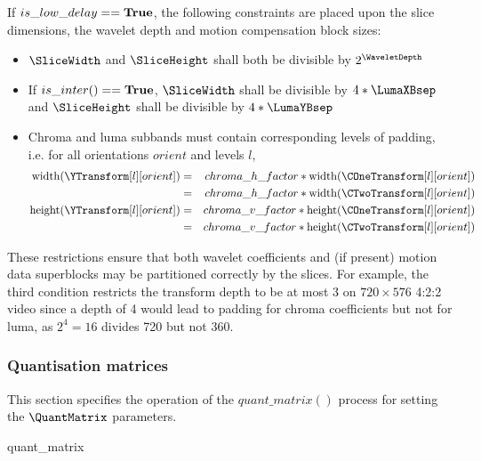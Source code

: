 If $is\_low\_delay==\text{\bf{True}}$, the following constraints are placed upon the slice dimensions, the wavelet depth
 and motion compensation block sizes:

\begin{itemize}
\item $\SliceWidth$ and $\SliceHeight$ shall both be divisible by $2^\WaveletDepth$
\item If $is\_inter()==\text{\bf{True}}$, $\SliceWidth$ shall be divisible by $4*\LumaXBsep$ and $\SliceHeight$ shall be divisible by $4*\LumaYBsep$
\item Chroma and luma subbands must contain corresponding levels of padding, i.e. for all orientations $orient$ and levels $l$,
\begin{eqnarray*}
\width(\YTransform[l][orient]) & = & chroma\_h\_factor*\width(\COneTransform[l][orient]) \\
& = & chroma\_h\_factor*\width(\CTwoTransform[l][orient]) \\
\height(\YTransform[l][orient]) & = & chroma\_v\_factor*\height(\COneTransform[l][orient]) \\
& = & chroma\_v\_factor*\height(\CTwoTransform[l][orient]) \\
\end{eqnarray*}
\end{itemize}

These restrictions ensure that both wavelet coefficients and (if present) motion data superblocks may be partitioned
correctly by the slices. For example, the third condition restricts the transform depth to be at most 3 on $720\times 576$ 4:2:2 video
since a depth of 4 would lead to padding for chroma coefficients but not for luma, as $2^4=16$ divides 720 but not 360.

\subsubsection{Quantisation matrices}
\label{quantmatrix}

This section specifies the operation of the $quant\_matrix()$ process for setting the $\QuantMatrix$ parameters.

\begin{pseudo}{quant\_matrix}{}
    \bsEND
\bsELSE
\bsEND
\end{pseudo}

